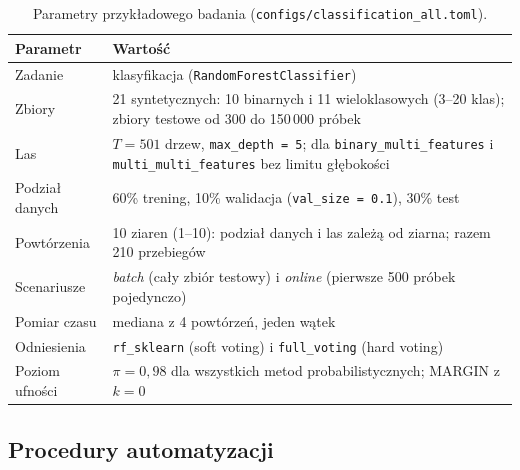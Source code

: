 \documentclass{article}
\newcommand{\code}[1]{\texttt{#1}}
\begin{document}
\begin{table}[H]
\centering
\footnotesize
\caption{Parametry przykładowego badania (\code{configs/classification\_all.toml}).}
\label{tab:badanie}
\begin{tabularx}{\textwidth}{@{}>{\raggedright\arraybackslash}p{4.2cm}X@{}}
\toprule
\textbf{Parametr} & \textbf{Wartość} \\
\midrule
Zadanie & klasyfikacja (\code{RandomForestClassifier}) \\
Zbiory & 21 syntetycznych: 10 binarnych i 11 wieloklasowych (3--20 klas); zbiory testowe od 300 do 150\,000 próbek \\
Las & $T = 501$ drzew, \code{max\_depth = 5}; dla \code{binary\_multi\_features} i \code{multi\_multi\_features} bez limitu głębokości \\
Podział danych & 60\% trening, 10\% walidacja (\code{val\_size = 0.1}), 30\% test \\
Powtórzenia & 10 ziaren (1--10): podział danych i las zależą od ziarna; razem 210 przebiegów \\
Scenariusze & \emph{batch} (cały zbiór testowy) i \emph{online} (pierwsze 500 próbek pojedynczo) \\
Pomiar czasu & mediana z 4 powtórzeń, jeden wątek \\
Odniesienia & \code{rf\_sklearn} (soft voting) i \code{full\_voting} (hard voting) \\
Poziom ufności & $\pi = 0{,}98$ dla wszystkich metod probabilistycznych; MARGIN z $k = 0$ \\
\bottomrule
\end{tabularx}
\end{table}

\subsection{Procedury automatyzacji}
\end{document}
